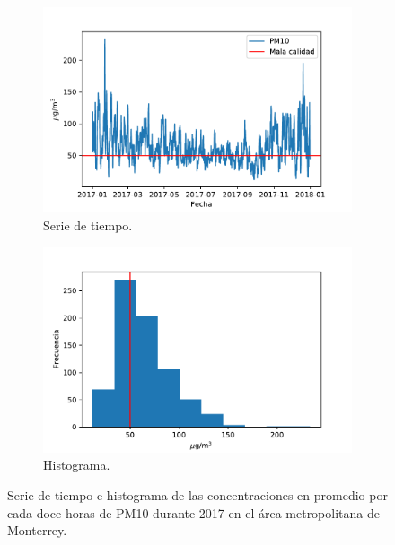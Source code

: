 \documentclass[paper=leter, fontsize=11pt]{scrartcl}
\begin{document}
\begin{figure}
  \begin{subfigure}{.8\textwidth}
    \centering
    \includegraphics{ts_2017_pm10.pdf}
    \caption{Serie de tiempo.}
\end{subfigure}
  \begin{subfigure}{.8\textwidth}
      \centering
      \includegraphics{hist_2017_pm10.pdf}
      \caption{Histograma.}
  \end{subfigure}
  \caption{Serie de tiempo e histograma de las concentraciones en promedio por cada doce horas de PM10 durante 2017 en el área metropolitana de Monterrey.}
  \label{fig:pm10}
\end{figure}
\end{document}
